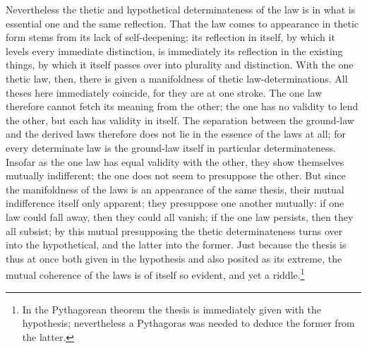 \documentclass[12pt,a4paper,openany]{book}
\newcommand{\opage}[1]{\marginnote{\footnotesize\textit{[#1]}}}
\begin{document}
Nevertheless the thetic and hypothetical determinateness of the law
is in what is essential one and the same reflection.
That the law comes to appearance in thetic form stems from
its lack of self-deepening; its reflection
in itself, by which it levels every immediate
distinction, is immediately its reflection in the existing
things, by which it itself passes over into plurality
and distinction. With the one thetic law, then, there is
given a manifoldness of thetic law-determinations.
All theses here immediately coincide,
for they are at one stroke. The one law therefore cannot
fetch its meaning from the other; the one
has no validity to lend the other, but each
has validity in itself. The separation between
the ground-law and the derived laws therefore does not lie
in the essence of the laws at all; for every determinate law
is the ground-law itself in particular determinateness. Insofar as
the one law has equal validity with the other,
they show themselves mutually indifferent; the one does not seem
to presuppose the other. But since the manifoldness
of the laws is an appearance of the
same thesis, their mutual
\setcounter{footnote}{0}%
\opage{189}indifference itself only apparent; they presuppose one another
mutually: if one law could fall away, then
they could all vanish; if the one law persists,
then they all subsist; by this mutual presupposing
the thetic determinateness turns over into the
hypothetical, and the latter into the former. Just because the thesis
is thus at once both given in the hypothesis
and also posited as its extreme, the mutual coherence of the laws is of itself so evident, and yet a riddle.\footnote{In the Pythagorean theorem the thesis is immediately given with the hypothesis; nevertheless a Pythagoras was needed to deduce the former from the latter.}
\end{document}
